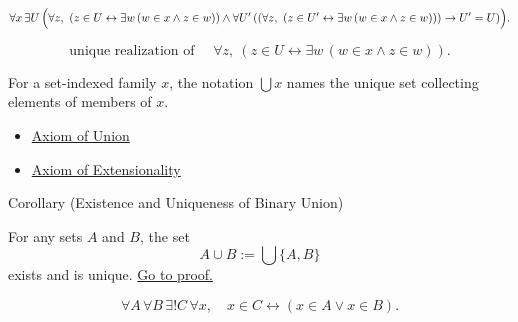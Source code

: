 

\begin{remark*}
\[
  \forall x\,\exists U\,
  \Bigl(
  \forall z,\ (z\in U\leftrightarrow \exists w\,(w\in x\wedge z\in w))
  \wedge
  \forall U'\,
  ((\forall z,\ (z\in U'\leftrightarrow \exists w\,(w\in x\wedge z\in w)))
  \to U'=U)
  \Bigr).
\]
\end{remark*}

\begin{remark*}
\[
  \text{unique realization of }\quad
  \forall z,\ (z\in U\leftrightarrow\exists w\,(w\in x\wedge z\in w)).
\]
\end{remark*}

\begin{remark*}[Interpretation]
For a set-indexed family \(x\), the notation \(\bigcup x\) names the unique
set collecting elements of members of \(x\).
\end{remark*}

\begin{dependencies}
\begin{itemize}
  \item \hyperref[ax:union]{Axiom of Union}
  \item \hyperref[ax:extensionality]{Axiom of Extensionality}
\end{itemize}
\end{dependencies}

\begin{corollarybox}{Corollary (Existence and Uniqueness of Binary Union)}
\begin{corollary}\label{cor:binary-union-exists-unique}
For any sets $A$ and $B$, the set
\[
  A\cup B:=\bigcup\{A,B\}
\]
exists and is unique.
\hyperref[prf:binary-union-exists-unique]{Go to proof.}
\end{corollary}
\end{corollarybox}



\begin{remark*}
\[
  \forall A\,\forall B\,\exists! C\,\forall x,\quad
  x\in C\leftrightarrow(x\in A\vee x\in B).
\]
\end{remark*}


